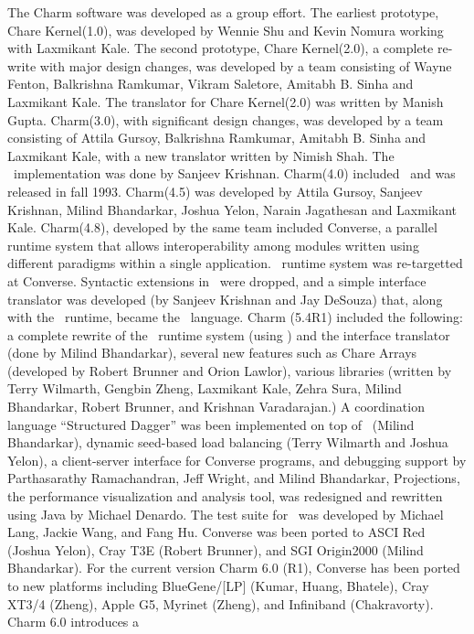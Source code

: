 The Charm software was developed as a
group effort.  The earliest prototype, Chare Kernel(1.0), was
developed by Wennie Shu and Kevin Nomura working with Laxmikant
Kale.  The second prototype, Chare Kernel(2.0), a complete
re-write with major design changes, was developed by a team
consisting of Wayne Fenton, Balkrishna Ramkumar, Vikram Saletore,
Amitabh B. Sinha and Laxmikant Kale. The translator for Chare
Kernel(2.0) was written by Manish Gupta.  Charm(3.0), with
significant design changes, was developed by a team consisting of
Attila Gursoy, Balkrishna Ramkumar, Amitabh B.  Sinha and
Laxmikant Kale, with a new translator written by Nimish Shah.  The
\charmpp\ implementation was done by Sanjeev Krishnan.  Charm(4.0)
included \charmpp\ and was released in fall 1993.  Charm(4.5) was
developed by Attila Gursoy, Sanjeev Krishnan, Milind Bhandarkar,
Joshua Yelon, Narain Jagathesan and Laxmikant Kale.  Charm(4.8),
developed by the same team included Converse, a parallel runtime
system that allows interoperability among modules written using
different paradigms within a single application. \charmpp\ runtime
system was re-targetted at Converse. Syntactic extensions in
\charmpp\ were dropped, and a simple interface translator was
developed (by Sanjeev Krishnan and Jay DeSouza) that, along with
the \charmpp\ runtime, became the \charmpp\ language.  Charm
(5.4R1) included the following: a complete rewrite of the
\charmpp\ runtime system (using \CC) and the interface translator
(done by Milind Bhandarkar), several new features such as Chare
Arrays (developed by Robert Brunner and Orion Lawlor), various
libraries (written by Terry Wilmarth, Gengbin Zheng, Laxmikant
Kale, Zehra Sura, Milind Bhandarkar, Robert Brunner, and Krishnan
Varadarajan.) A coordination language ``Structured Dagger'' was
been implemented on top of \charmpp\ (Milind Bhandarkar), dynamic
seed-based load balancing (Terry Wilmarth and Joshua Yelon), a
client-server interface for Converse programs, and debugging
support by Parthasarathy Ramachandran, Jeff Wright, and Milind
Bhandarkar, Projections, the performance visualization and
analysis tool, was redesigned and rewritten using Java by Michael
Denardo. The test suite for \charmpp\ was developed by Michael
Lang, Jackie Wang, and Fang Hu. Converse was been ported to ASCI
Red (Joshua Yelon), Cray T3E (Robert Brunner), and SGI Origin2000
(Milind Bhandarkar). For the current version Charm 6.0 (R1),
Converse has been ported to new platforms including BlueGene/[LP]
(Kumar, Huang, Bhatele), Cray XT3/4 (Zheng), Apple G5, Myrinet
(Zheng), and Infiniband (Chakravorty).  Charm 6.0 introduces a
